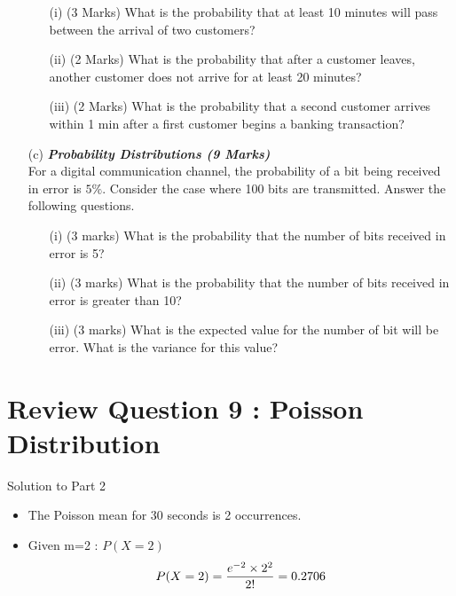 \begin{itemize}
\begin{itemize}
\item[(i)] (3 Marks) What is the probability that at least 10 minutes will pass between the arrival of two customers?
\item[(ii)] (2 Marks) What is the probability that after a customer leaves, another customer does not arrive for at least 20 minutes?
\item[(iii)] (2 Marks) What is the probability that a second customer arrives within 1 min after a first customer begins a banking transaction?
\end{itemize}
\bigskip
\item[(c)] \textbf{\textit{Probability Distributions (9 Marks)}}\\
For a digital communication channel, the probability of a bit being received in error is $5\%$. Consider the case where 100 bits are transmitted. Answer the following questions.

\begin{itemize}
\item[(i)] (3 marks)	What is the probability that the number of bits received in error is 5?
\item[(ii)] (3 marks) What is the probability that the number of bits received in error is greater than 10?
\item[(iii)] (3 marks) What is the expected value for the number of bit will be error. What is the variance for this value?
\end{itemize}





\end{itemize}


\section{Review Question 9 :  Poisson Distribution}
Solution to Part 2
\begin{itemize}
\item The Poisson mean for 30 seconds is 2 occurrences.
\item Given m=2 : $P(X = 2)$
\[P(X = 2) = { e^{-2} \times 2^2\over 2!} = 0.2706 \]
\end{itemize}


